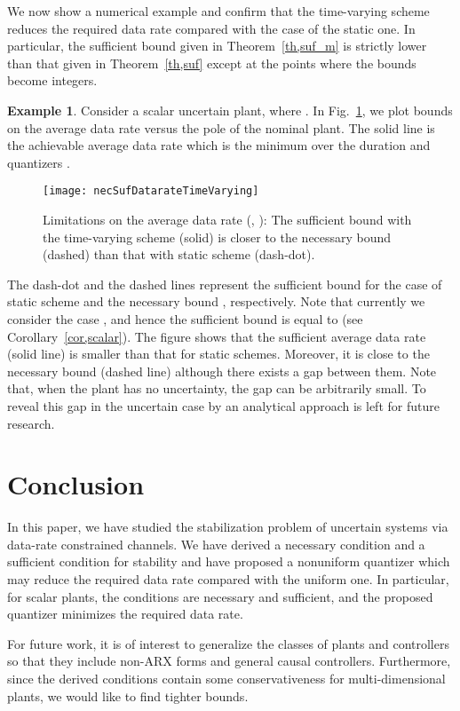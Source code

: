 \documentclass[a4paper, 11pt]{article}
\theoremstyle{definition}
\newtheorem{exmp}{Example}
\newcommand{\fref}[1]{Fig.~\ref{#1}}
\begin{document}
We now show a numerical example and confirm that the time-varying scheme
reduces the required data rate compared with the case of the static one.
In particular, the sufficient bound given in Theorem~\ref{th,suf_m} is
strictly lower than that given in Theorem~\ref{th,suf} except at the points
where the bounds become integers.
\begin{exmp}
Consider a scalar uncertain plant, where .
In \fref{fig,mstep}, we plot bounds on the average data rate
versus the pole  of the nominal plant.
The solid line is the achievable average data rate which is the minimum over
the duration  and quantizers .
\begin{figure}[t]
 \centering
 \texttt{[image: necSufDatarateTimeVarying]}
 \caption{Limitations on the average data rate (, ):
 The sufficient bound with the time-varying scheme (solid) is closer
 to the necessary bound (dashed) than that with static scheme (dash-dot).}
 \label{fig,mstep}
\end{figure}
The dash-dot and the dashed lines represent the sufficient bound for
the case of static scheme and the necessary bound , respectively.
Note that currently we consider the case , and hence the sufficient
bound is equal to  (see Corollary~\ref{cor,scalar}).
The figure shows that the sufficient average data rate (solid line) is
smaller than that for static schemes.
Moreover, it is close to the necessary bound (dashed line) although there
exists a gap between them.
Note that, when the plant has no uncertainty, the gap can be arbitrarily small.
To reveal this gap in the uncertain case by an analytical approach is left
for future research.
\end{exmp}


\section{Conclusion}\label{sec,conclusion}
In this paper, we have studied the stabilization problem of uncertain systems
via data-rate constrained channels.
We have derived a necessary condition and a sufficient condition for stability
and have proposed a nonuniform quantizer which may reduce the required
data rate compared with the uniform one.
In particular, for scalar plants, the conditions are necessary
and sufficient, and the proposed quantizer minimizes the required data rate.

For future work, it is of interest to generalize the classes of plants and
controllers so that they include non-ARX forms and general causal controllers.
Furthermore, since the derived conditions contain some conservativeness for
multi-dimensional plants, we would like to find tighter bounds.
\end{document}
